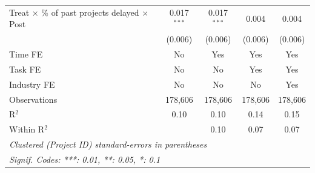 \documentclass[
]{article}
\begin{document}
\begin{tabular}{lcccc}
   Treat $\times$ \% of past projects delayed $\times$ Post    & 0.017$^{***}$  & 0.017$^{***}$  & 0.004          & 0.004\\   
                                                               & (0.006)        & (0.006)        & (0.006)        & (0.006)\\   
   Time FE                                                     & No             & Yes            & Yes            & Yes\\  
   Task FE                                                     & No             & No             & Yes            & Yes\\  
   Industry FE                                                 & No             & No             & No             & Yes\\  
   Observations                                                & 178,606        & 178,606        & 178,606        & 178,606\\  
   R$^2$                                                       & 0.10           & 0.10           & 0.14           & 0.15\\  
   Within R$^2$                                                &                & 0.10           & 0.07           & 0.07\\  
   \midrule
   \multicolumn{5}{l}{\emph{Clustered (Project ID) standard-errors in parentheses}}\\
   \multicolumn{5}{l}{\emph{Signif. Codes: ***: 0.01, **: 0.05, *: 0.1}}\\
\end{tabular}
\par\endgroup
\end{document}
